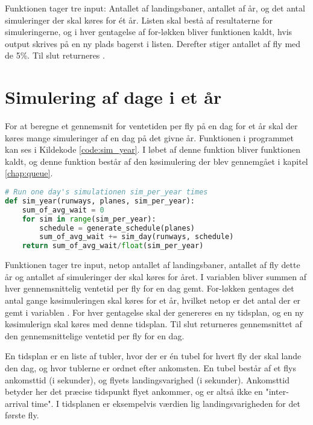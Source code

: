 Funktionen tager tre input: Antallet af landingsbaner, antallet af år, og det antal simuleringer der skal køres for ét år.
Listen  skal bestå af resultaterne for simuleringerne, og i hver gentagelse af for-løkken bliver funktionen  kaldt, hvis output skrives på en ny plads bagerst i listen.
Derefter stiger antallet af fly med de 5\%.
Til slut returneres .

\section{Simulering af dage i et år}
For at beregne et gennemsnit for ventetiden per fly på en dag for et år skal der køres mange simuleringer af en dag på det givne år.
Funktionen  i programmet kan ses i Kildekode \ref{code:sim_year}.
I løbet af denne funktion bliver funktionen  kaldt, og denne funktion består af den køsimulering der blev gennemgået i kapitel \ref{chap:queue}. 

\begin{lstlisting}[language=Python, caption={sim\_year-funktionen i airplanes.py}, label=code:sim_year]
# Run one day's simulationen sim_per_year times
def sim_year(runways, planes, sim_per_year):
    sum_of_avg_wait = 0    
    for sim in range(sim_per_year):
        schedule = generate_schedule(planes)
        sum_of_avg_wait += sim_day(runways, schedule)
    return sum_of_avg_wait/float(sim_per_year)
\end{lstlisting}

Funktionen  tager tre input, netop antallet af landingsbaner, antallet af fly dette år og antallet af simuleringer der skal køres for året.
I variablen  bliver summen af hver gennemsnittelig ventetid per fly for en dag gemt.
For-løkken gentages det antal gange køsimuleringen skal køres for et år, hvilket netop er det antal der er gemt i variablen .
For hver gentagelse skal der genereres en ny tidsplan, og en ny køsimulerign skal køres med denne tidsplan.
Til slut returneres gennemsnittet af den gennemsnittelige ventetid per fly for en dag.

En tidsplan er en liste af tubler, hvor der er én tubel for hvert fly der skal lande den dag, og hvor tublerne er ordnet efter ankomsten.
En tubel består af et flys ankomsttid (i sekunder), og flyets landingsvarighed (i sekunder).
Ankomsttid betyder her det præcise tidspunkt flyet ankommer, og er altså ikke en "inter-arrival time".
I tidsplanen er eksempelvis værdien  lig landingsvarigheden for det første fly.

